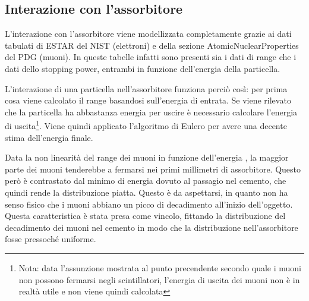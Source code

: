 \subsection{Interazione con l'assorbitore}
L'interazione con l'assorbitore viene modellizzata completamente grazie ai dati tabulati di ESTAR del NIST (elettroni) e della sezione AtomicNuclearProperties del PDG (muoni). In queste tabelle infatti sono presenti sia i dati di range che i dati dello stopping power, entrambi in funzione dell'energia della particella.

L'interazione di una particella nell'assorbitore funziona perci\`o cos\`i: per prima cosa viene calcolato il range basandosi sull'energia di entrata. 
Se viene rilevato che la particella ha abbastanza energia per uscire \`e necessario calcolare l'energia di uscita\footnote{Nota: data l'assunzione mostrata al punto precendente secondo quale i muoni non possono fermarsi negli scintillatori, l'energia di uscita dei muoni non \`e in realt\`a utile e non viene quindi calcolata}. 
Viene quindi applicato l'algoritmo di Eulero per avere una decente stima dell'energia finale.

Data la non linearit\`a del range dei muoni in funzione dell'energia , la maggior parte dei muoni tenderebbe a fermarsi nei primi millimetri di assorbitore. Questo per\`o \`e contrastato dal minimo di energia dovuto al passagio nel cemento, che quindi rende la distribuzione piatta. Questo \`e da aspettarsi, in quanto non ha senso fisico che i muoni abbiano un picco di decadimento all'inizio dell'oggetto. Questa caratteristica \`e stata presa come vincolo, fittando la distribuzione del decadimento dei muoni nel cemento in modo che la distribuzione nell'assorbitore fosse pressoch\'e uniforme.
